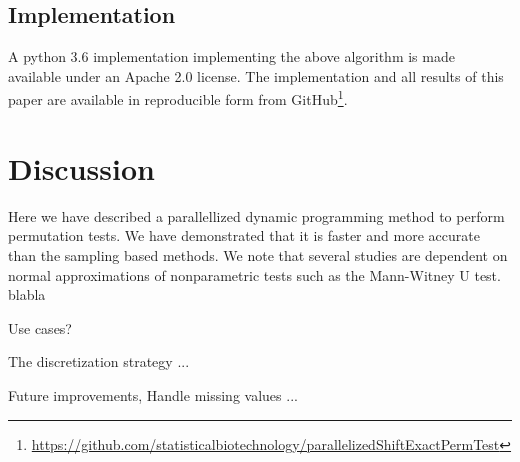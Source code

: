 \documentclass[a4paper]{article}
\begin{document}

\subsection{Implementation}
A python 3.6 implementation implementing the above algorithm is made available under an Apache 2.0 license. The implementation and all results of this paper are available in reproducible form from GitHub\footnote{\href{https://github.com/statisticalbiotechnology/parallelizedShiftExactPermTest}{https://github.com/statisticalbiotechnology/parallelizedShiftExactPermTest}}.

\section{Discussion}

Here we have described a parallellized dynamic programming method to perform permutation tests. We have demonstrated that it is faster and more accurate than the sampling based methods. We note that several studies are dependent on normal approximations of nonparametric tests such as the Mann-Witney U test. blabla

Use cases?

The discretization strategy ...

Future improvements, Handle missing values ...
\end{document}
